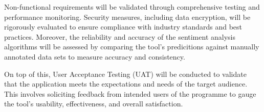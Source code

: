 Non-functional requirements will be validated through comprehensive testing and performance monitoring. Security measures, including data encryption, will be rigorously evaluated to ensure compliance with industry standards and best practices. Moreover, the reliability and accuracy of the sentiment analysis algorithms will be assessed by comparing the tool's predicitions against manually annotated data sets to measure accuracy and consistency.

On top of this, User Acceptance Testing (UAT) will be conducted to validate that the application meets the expectations and needs of the target audience. This involves soliciting feedback from intended users of the programme to gauge the tool's usability, effectiveness, and overall satisfaction.